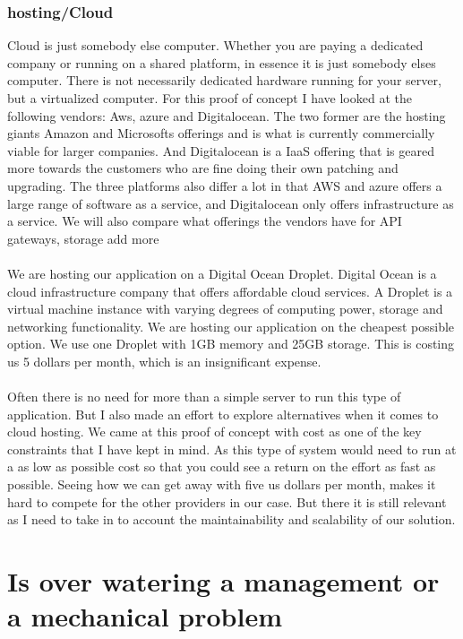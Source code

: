 \documentclass[]{uiophd}
\begin{document}
\subsubsection{hosting/Cloud}
Cloud is just somebody else computer. Whether you are paying a dedicated company or running on a shared platform, in essence it is just somebody elses computer. There is not necessarily dedicated hardware running for your server, but a virtualized computer. For this proof of concept I have looked at the following vendors: Aws, azure and Digitalocean. The two former are the hosting giants Amazon and Microsofts offerings and is what is currently commercially viable for larger companies. And Digitalocean is a IaaS offering that is geared more towards the customers who are fine doing their own patching and upgrading. The three platforms also differ a lot in that AWS and azure offers a large range of software as a service, and Digitalocean only offers infrastructure as a service. We will also compare what offerings the vendors have for API gateways, storage {add more}
\\\\
We are hosting our application on a Digital Ocean Droplet. Digital Ocean is a cloud infrastructure company that offers affordable cloud services. A Droplet is a virtual machine instance with varying degrees of computing power, storage and networking functionality. We are hosting our application on the cheapest possible option. We use one Droplet with 1GB memory and 25GB storage. This is costing us 5 dollars per month, which is an insignificant expense. 
\\\\
Often there is no need for more than a simple server to run this type of application. But I also made an effort to explore alternatives when it comes to cloud hosting. We came at this proof of concept with cost as one of the key constraints that I have kept in mind. As this type of system would need to run at a as low as possible cost so that you could see a return on the effort as fast as possible. Seeing how we can get away with five us dollars per month, makes it hard to compete for the other providers in our case. But there it is still relevant as I need to take in to account the maintainability and scalability of our solution.

\section{Is over watering a management or a mechanical problem}
\end{document}
